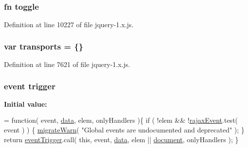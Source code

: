 \subsubsection[{\texorpdfstring{toggle}{toggle}}]{ {\bf fn} toggle}\hypertarget{jquery-1_8x_8js_ac78f284f91282bbaa8bfd9763293cebb}{}\label{jquery-1_8x_8js_ac78f284f91282bbaa8bfd9763293cebb}


Definition at line 10227 of file jquery-\/1.\+x.\+js.

\subsubsection[{\texorpdfstring{transports}{transports}}]{\setlength{\rightskip}{0pt plus 5cm}var transports = \{\}}\hypertarget{jquery-1_8x_8js_ae354ef69102eb621a6b2ef6c9fc4d6a3}{}\label{jquery-1_8x_8js_ae354ef69102eb621a6b2ef6c9fc4d6a3}


Definition at line 7621 of file jquery-\/1.\+x.\+js.

\subsubsection[{\texorpdfstring{trigger}{trigger}}]{ event trigger}\hypertarget{jquery-1_8x_8js_a3a2670632785d79909fadd16431e30f9}{}\label{jquery-1_8x_8js_a3a2670632785d79909fadd16431e30f9}
{\bfseries Initial value\+:}
\begin{DoxyCode}
= \textcolor{keyword}{function}( event, \hyperlink{jquery-1_8x_8js_ad800f38c547e3a3ed2b14d23d10fc2b1}{data}, elem, onlyHandlers  )\{
    \textcolor{keywordflow}{if} ( !elem && !\hyperlink{jquery-1_8x_8js_a9c1dd76dd7323bf3aad84b78ea51b475}{rajaxEvent}.test( event ) ) \{
        \hyperlink{jquery-1_8x_8js_ac6036b3100bb484f96bfb15165e077f9}{migrateWarn}( \textcolor{stringliteral}{"Global events are undocumented and deprecated"} );
    \}
    \textcolor{keywordflow}{return} \hyperlink{jquery-1_8x_8js_a795caa3304cb75e9e688526722c89349}{eventTrigger}.call( \textcolor{keyword}{this},  event, \hyperlink{jquery-1_8x_8js_ad800f38c547e3a3ed2b14d23d10fc2b1}{data}, elem || 
      \hyperlink{classdocument}{document}, onlyHandlers  );
\}
\end{DoxyCode}


